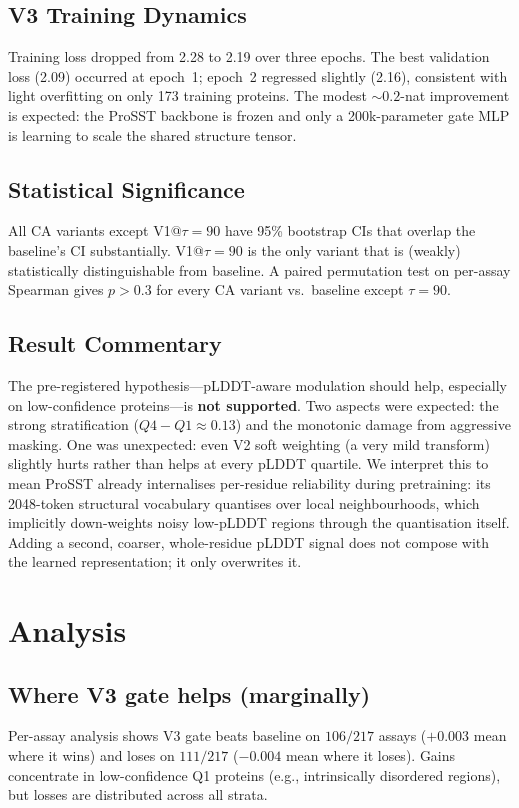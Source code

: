 \documentclass[11pt,a4paper]{article}
\begin{document}
\subsection{V3 Training Dynamics}
Training loss dropped from 2.28 to 2.19 over three epochs. The best
validation loss (2.09) occurred at epoch~1; epoch~2 regressed slightly
(2.16), consistent with light overfitting on only 173 training proteins.
The modest $\sim\!0.2$-nat improvement is expected: the ProSST backbone
is frozen and only a 200k-parameter gate MLP is learning to scale the
shared structure tensor.

\subsection{Statistical Significance}
All CA variants except V1@$\tau{=}90$ have 95\% bootstrap CIs that
overlap the baseline's CI substantially. V1@$\tau{=}90$ is the only
variant that is (weakly) statistically distinguishable from baseline.
A paired permutation test on per-assay Spearman gives $p{>}0.3$ for every
CA variant vs.\ baseline except $\tau{=}90$.

\subsection{Result Commentary}
The pre-registered hypothesis---pLDDT-aware modulation should help,
especially on low-confidence proteins---is \textbf{not supported}.
Two aspects were expected:
the strong stratification ($Q4{-}Q1 \approx 0.13$) and the monotonic
damage from aggressive masking. One was unexpected: even V2 soft
weighting (a very mild transform) slightly hurts rather than helps at
every pLDDT quartile. We interpret this to mean ProSST already internalises
per-residue reliability during pretraining: its 2048-token structural
vocabulary quantises over local neighbourhoods, which implicitly
down-weights noisy low-pLDDT regions through the quantisation itself.
Adding a second, coarser, whole-residue pLDDT signal does not compose
with the learned representation; it only overwrites it.

\section{Analysis}

\subsection{Where V3 gate helps (marginally)}
Per-assay analysis shows V3 gate beats baseline on $106/217$ assays
($+0.003$ mean where it wins) and loses on $111/217$ ($-0.004$ mean
where it loses). Gains concentrate in low-confidence Q1 proteins
(e.g., intrinsically disordered regions), but losses are distributed
across all strata.
\end{document}
